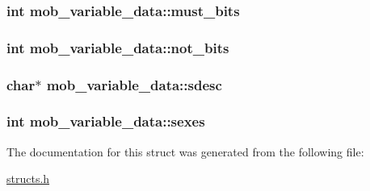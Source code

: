 \hypertarget{structmob__variable__data_a67ba1cd09055d14386032befcfded821}{
\subsubsection[{must\-\_\-bits}]{\setlength{\rightskip}{0pt plus 5cm}int mob\-\_\-variable\-\_\-data\-::must\-\_\-bits}}\label{structmob__variable__data_a67ba1cd09055d14386032befcfded821}
\hypertarget{structmob__variable__data_a7f6452ec387fdd6bc38850899d1355a1}{
\subsubsection[{not\-\_\-bits}]{\setlength{\rightskip}{0pt plus 5cm}int mob\-\_\-variable\-\_\-data\-::not\-\_\-bits}}\label{structmob__variable__data_a7f6452ec387fdd6bc38850899d1355a1}
\hypertarget{structmob__variable__data_af28c60cdb72077656863dcf5dc66e6f1}{
\subsubsection[{sdesc}]{\setlength{\rightskip}{0pt plus 5cm}char$\ast$ mob\-\_\-variable\-\_\-data\-::sdesc}}\label{structmob__variable__data_af28c60cdb72077656863dcf5dc66e6f1}
\hypertarget{structmob__variable__data_a5a29910a8dcff5aaa22ad293a0206b21}{
\subsubsection[{sexes}]{\setlength{\rightskip}{0pt plus 5cm}int mob\-\_\-variable\-\_\-data\-::sexes}}\label{structmob__variable__data_a5a29910a8dcff5aaa22ad293a0206b21}


The documentation for this struct was generated from the following file\-:\begin{DoxyCompactItemize}
\item 
\hyperlink{structs_8h}{structs.\-h}\end{DoxyCompactItemize}
